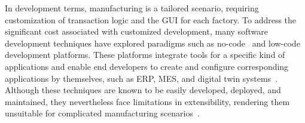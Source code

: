 \documentclass[preprint,12pt]{elsarticle}
\begin{document}
In development terms, manufacturing is a tailored scenario, requiring customization of transaction logic and the GUI for each factory.
To address the significant cost associated with customized development, many software development techniques have explored paradigms such as no-code~\cite{rokis2022challenges} and low-code~\cite{cabot2020positioning} development platforms.
These platforms integrate tools for a specific kind of applications and enable end developers to create and configure corresponding applications by themselves, such as ERP, MES, and digital twin systems~\cite{DALIBOR2022101117}.
Although these techniques are known to be easily developed, deployed, and maintained, they nevertheless face limitations in extensibility, rendering them unsuitable for complicated manufacturing scenarios~\cite{rokis2022challenges}.
\end{document}
